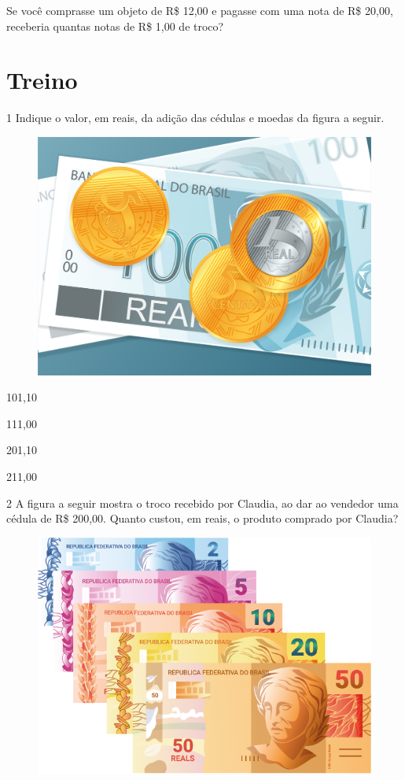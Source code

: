 Se você comprasse um objeto de R\$ 12,00 e pagasse com uma nota de R\$
20,00, receberia quantas notas de R\$ 1,00 de troco?


\section*{Treino}

\num{1} Indique o valor, em reais, da adição das cédulas e moedas da figura a seguir.


\begin{figure}[htpb!]
\centering
\includegraphics[width=.4\textwidth]{./media/image79.png}
\end{figure}

\begin{multicols}{2}
\begin{escolha}[itemsep=-5pt]
\item 101,10

\item 111,00

\item 201,10

\item 211,00
\end{escolha}
\end{multicols}

\num{2} A figura a seguir mostra o troco recebido por Claudia, ao dar ao vendedor
uma cédula de R\$ 200,00. Quanto custou, em reais, o produto comprado por Claudia?


\begin{figure}[htpb!]
\centering
\includegraphics[width=.5\textwidth]{./media/image78.png}
\end{figure}

